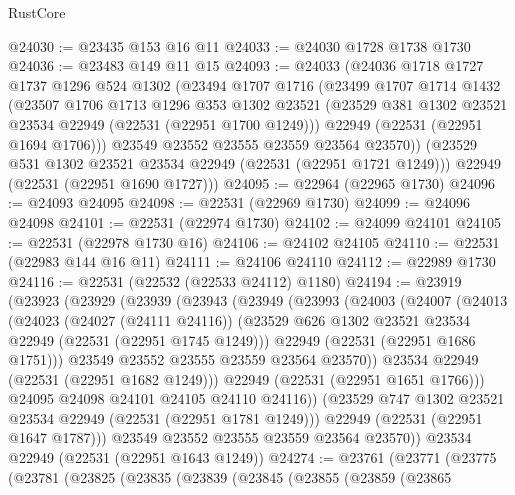 \begin{lexlean}{RustCore}
\begin{coremodule}
@24030 := @23435 @153 @16 @11
@24033 := @24030 @1728 @1738 @1730
@24036 := @23483 @149 @11 @15
@24093 := @24033
    (@24036
      @1718
      @1727
      @1737
      @1296
      @524
      @1302
      (@23494
        @1707
        @1716
        (@23499
          @1707
          @1714
          @1432
          (@23507
            @1706
            @1713
            @1296
            @353
            @1302
            @23521
            (@23529 @381 @1302 @23521 @23534 @22949 (@22531 (@22951 @1700 @1249)))
            @22949
            (@22531 (@22951 @1694 @1706)))
          @23549
          @23552
          @23555
          @23559
          @23564
          @23570))
      (@23529 @531 @1302 @23521 @23534 @22949 (@22531 (@22951 @1721 @1249)))
      @22949
      (@22531 (@22951 @1690 @1727)))
@24095 := @22964 (@22965 @1730)
@24096 := @24093 @24095
@24098 := @22531 (@22969 @1730)
@24099 := @24096 @24098
@24101 := @22531 (@22974 @1730)
@24102 := @24099 @24101
@24105 := @22531 (@22978 @1730 @16)
@24106 := @24102 @24105
@24110 := @22531 (@22983 @144 @16 @11)
@24111 := @24106 @24110
@24112 := @22989 @1730
@24116 := @22531 (@22532 (@22533 @24112) @1180)
@24194 := @23919
    (@23923
      (@23929
        (@23939
          (@23943
            (@23949
              (@23993
                (@24003
                  (@24007
                    (@24013
                      (@24023
                        (@24027 (@24111 @24116))
                        (@23529 @626 @1302 @23521 @23534 @22949 (@22531 (@22951 @1745 @1249)))
                        @22949
                        (@22531 (@22951 @1686 @1751)))
                      @23549
                      @23552
                      @23555
                      @23559
                      @23564
                      @23570))
                  @23534
                  @22949
                  (@22531 (@22951 @1682 @1249)))
                @22949
                (@22531 (@22951 @1651 @1766)))
              @24095
              @24098
              @24101
              @24105
              @24110
              @24116))
          (@23529 @747 @1302 @23521 @23534 @22949 (@22531 (@22951 @1781 @1249)))
          @22949
          (@22531 (@22951 @1647 @1787)))
        @23549
        @23552
        @23555
        @23559
        @23564
        @23570))
    @23534
    @22949
    (@22531 (@22951 @1643 @1249))
@24274 := @23761
    (@23771
      (@23775
        (@23781
          (@23825
            (@23835
              (@23839
                (@23845
                  (@23855
                    (@23859
                      (@23865

\end{coremodule}
\end{lexlean}
